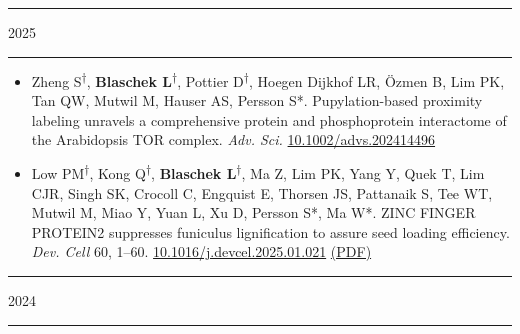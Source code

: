 \documentclass[11pt]{article}
\newcommand*{\xdash}[1][3em]{\rule[0.5ex]{#1}{0.55pt}}
\begin{document}


\hspace*{\fill} \xdash[6em] \large{\textsc{2025}} \xdash[6em] \hspace*{\fill} \normalsize

\vspace{-0.175cm}	
\begin{itemize}[label={},itemindent=-9pt,leftmargin=24pt]
	\itemsep-0.1cm
	\item Zheng S\textsuperscript{$\dagger$}, \textbf{Blaschek L}\textsuperscript{$\dagger$}, Pottier D\textsuperscript{$\dagger$}, Hoegen Dijkhof LR, Özmen B, Lim PK, Tan QW, Mutwil M, Hauser AS, Persson S*. Pupylation-based proximity labeling unravels a comprehensive protein and phosphoprotein interactome of the Arabidopsis TOR complex. \textit{Adv. Sci.} \href{https://doi.org/10.1002/advs.202414496}{10.1002/advs.202414496}
	\item Low PM\textsuperscript{$\dagger$}, Kong Q\textsuperscript{$\dagger$}, \textbf{Blaschek L}\textsuperscript{$\dagger$}, Ma Z, Lim PK, Yang Y, Quek T, Lim CJR, Singh SK, Crocoll C, Engquist E, Thorsen JS, Pattanaik S, Tee WT, Mutwil M, Miao Y, Yuan L, Xu D, Persson S*, Ma W*. ZINC FINGER PROTEIN2 suppresses funiculus lignification to assure seed loading efficiency. \textit{Dev. Cell} 60, 1–60. \href{https://doi.org/10.1016/j.devcel.2025.01.021}{10.1016/j.devcel.2025.01.021} \href{https://leonardblaschek.github.io/assets/pdf/10_1016_j_devcel_2025_01_021.pdf}{(PDF)}
\end{itemize}

\hspace*{\fill} \xdash[6em] \large{\textsc{2024}} \xdash[6em] \hspace*{\fill} \normalsize
\end{document}
